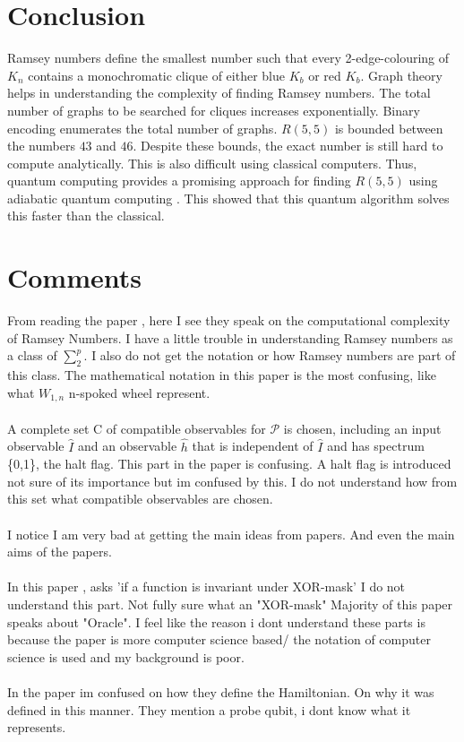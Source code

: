 \documentclass{Assignment}
\begin{document}
\section{Conclusion}
Ramsey numbers define the smallest number such that every 2-edge-colouring of $K_n$ contains a monochromatic clique of either blue $K_b$ or red $K_b$.
Graph theory helps in understanding the complexity of finding Ramsey numbers.
The total number of graphs to be searched for cliques increases exponentially.
Binary encoding enumerates the total number of graphs.
$R(5,5)$ is bounded between the numbers $43$ and $46$.
Despite these bounds, the exact number is still hard to compute analytically.
This is also difficult using classical computers.
Thus, quantum computing provides a promising approach for finding $R(5,5)$ using adiabatic quantum computing \cite{PhysRevA.93.032301}.
This showed that this quantum algorithm solves this faster than the classical.
\newpage
\section*{Comments}




From reading the paper \cite{burr1981generalized}, here I see they speak on the computational complexity of Ramsey Numbers. 
I have a little trouble in understanding Ramsey numbers as a class of $\sum_{2}^{p}$. 
I also do not get the notation or how Ramsey numbers are part of this class.
The mathematical notation in this paper is the most confusing, like what $W_{1,n}$ n-spoked wheel represent.
\\
\\
\cite{Deutsch1989}
A complete set C of compatible observables for $\mathcal{P}$ is chosen, including an input 
observable $\hat{I}$ and an observable $\hat{h}$ that is independent of $\hat{I}$ and has spectrum \{0,1\}, the halt flag. 
This part in the paper is confusing.
A halt flag is introduced not sure of its importance but im confused by this.
I do not understand how from this set what compatible observables are chosen.
\\
\\
I notice I am very bad at getting the main ideas from papers.
And even the main aims of the papers.
\\
\\
In this paper \cite{doi:10.1137/S0097539796298637}, asks 'if a function is invariant under XOR-mask' I do not understand this part.
Not fully sure what an "XOR-mask"
Majority of this paper speaks about "Oracle".
I feel like the reason i dont understand these parts is because the paper is more computer science based/ the notation of computer science is used and my background is poor. 
\\\\
In the paper \cite{PhysRevA.93.032301} im confused on how they define the Hamiltonian. 
On why it was defined in this manner.
They mention a probe qubit, i dont know what it represents.
\end{document}
